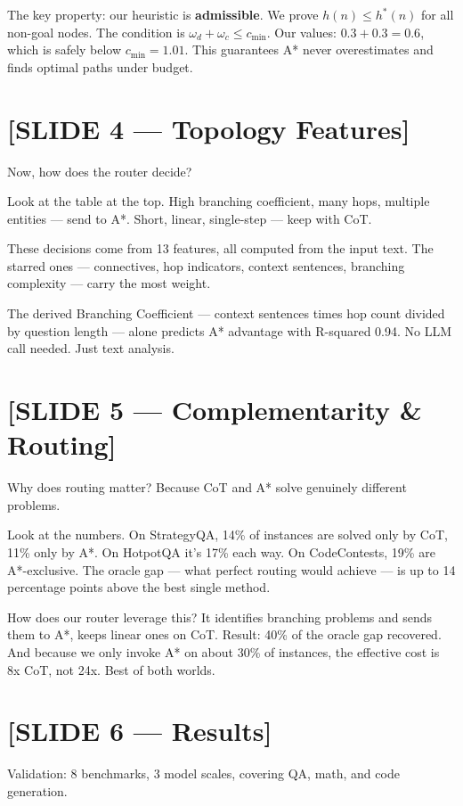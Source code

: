 \documentclass[11pt]{article}
\begin{document}
The key property: our heuristic is \textbf{admissible}. We prove $h(n) \leq h^*(n)$ for all non-goal nodes. The condition is $\omega_d + \omega_c \leq c_{\min}$. Our values: $0.3 + 0.3 = 0.6$, which is safely below $c_{\min} = 1.01$. This guarantees A* never overestimates and finds optimal paths under budget.

\section{[SLIDE 4 --- Topology Features]}

Now, how does the router decide?

Look at the table at the top. High branching coefficient, many hops, multiple entities --- send to A*. Short, linear, single-step --- keep with CoT.

These decisions come from 13 features, all computed from the input text. The starred ones --- connectives, hop indicators, context sentences, branching complexity --- carry the most weight.

The derived Branching Coefficient --- context sentences times hop count divided by question length --- alone predicts A* advantage with R-squared 0.94. No LLM call needed. Just text analysis.

\section{[SLIDE 5 --- Complementarity \& Routing]}

Why does routing matter? Because CoT and A* solve genuinely different problems.

Look at the numbers. On StrategyQA, 14\% of instances are solved only by CoT, 11\% only by A*. On HotpotQA it's 17\% each way. On CodeContests, 19\% are A*-exclusive. The oracle gap --- what perfect routing would achieve --- is up to 14 percentage points above the best single method.

How does our router leverage this? It identifies branching problems and sends them to A*, keeps linear ones on CoT. Result: 40\% of the oracle gap recovered. And because we only invoke A* on about 30\% of instances, the effective cost is 8x CoT, not 24x. Best of both worlds.

\section{[SLIDE 6 --- Results]}

Validation: 8 benchmarks, 3 model scales, covering QA, math, and code generation.
\end{document}
